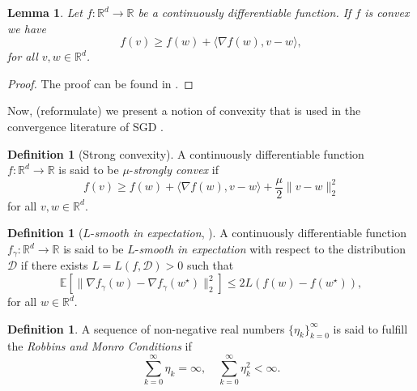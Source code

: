 \documentclass[12pt]{article}
\newtheorem{lemma}[theorem]{Lemma}
\theoremstyle{definition}
\newtheorem{definition}[theorem]{Definition}
\numberwithin{equation}{section}
\newcommand{\R}{\mathbb{R}}
\newcommand{\norm}[1]{\lVert{#1}\rVert_2}
\begin{document}
\begin{lemma}
  \label{lemma:convexity}
  Let $f : \mathbb{R}^d \rightarrow \mathbb{R}$ be a continuously differentiable function. If $f$ is convex we have
  \begin{equation*}
    f(v) \geq f(w) + \langle \nabla f(w), v-w \rangle,
  \end{equation*}
  for all $v,w \in \R^d$.
\end{lemma}
\begin{proof}
  The proof can be found in \autocite{boydConvexOptimization2004}.
\end{proof}

Now, (reformulate) we present a notion of convexity that is used in the convergence literature of SGD \autocite{sebbouhAlmostSureConvergence2021}. 
\begin{definition}[Strong convexity]
  A continuously differentiable function $f : \mathbb{R}^d \rightarrow \mathbb{R}$ is said to be $\mu$-\emph{strongly convex} if
  \begin{equation}
    f(v) \geq f(w) + \langle \nabla f(w), v - w \rangle + \frac{\mu}{2} \norm{v - w}^2
  \end{equation}
  for all $v, w \in \mathbb{R}^d$.
\end{definition}

\begin{definition}[$L$-\emph{smooth in expectation}, ]
  A continuously differentiable  function $f_{\gamma}:\mathbb{R}^d \rightarrow \mathbb{R}$ is said to be $L$-\emph{smooth in expectation} with respect to the distribution $\mathcal{D}$ if there exists $L = L(f, \mathcal{D}) > 0$ such that 
  \begin{equation}
    \mathbb{E}[\norm{\nabla f_{\gamma}(w) - \nabla f_{\gamma}(w^\star)}^2] \leq 2 L(f(w) - f(w^\star)),
  \end{equation}
  for all $w \in \mathbb{R}^d$. 
\end{definition}

\begin{definition}
  A sequence of non-negative real numbers $\{\eta_k\}_{k=0}^\infty$ is said to fulfill the \emph{Robbins and Monro Conditions} if
  \begin{equation*}
    \sum_{k=0}^\infty \eta_k = \infty, \quad \sum_{k=0}^\infty \eta_k^2 < \infty.
  \end{equation*}
\end{definition}
\end{document}
